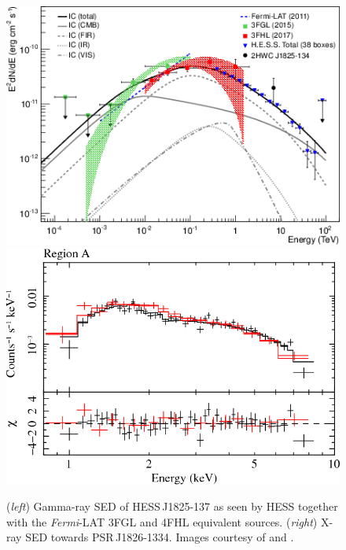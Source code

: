 \begin{figure}[h!]
	\centering
	\includegraphics[height=0.2\textheight]{04_Introduction/Images/pulsar_wind_nebula/1825_energy_flux.png}
    \includegraphics[height=0.2\textheight]{04_Introduction/Images/pulsar_wind_nebula/1825_xray_flux.png}
    \caption{(\textit{left}) Gamma-ray SED of \mbox{HESS\,J1825-137} as seen by HESS together with the \textit{Fermi}-LAT 3FGL and 4FHL equivalent sources. (\textit{right}) X-ray SED towards \mbox{PSR\,J1826-1334}. Images courtesy of \cite{2019A&A...621A.116H} and \cite{2009PASJ...61S.189U}.}
    \label{fig:chapter1_hess_j1825_morphology_paramaters}
\end{figure}

